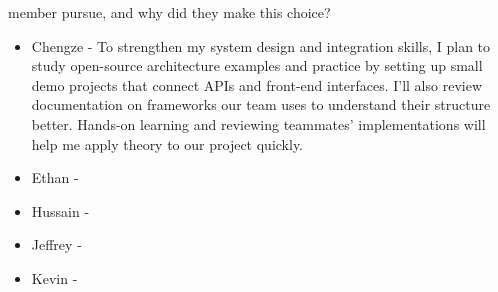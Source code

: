 \begin{enumerate}
  member pursue, and why did they make this choice?
  \begin{itemize}
        \item Chengze - To strengthen my system design and integration skills, 
        I plan to study open-source architecture examples and practice by setting 
        up small demo projects that connect APIs and front-end interfaces. I’ll also 
        review documentation on frameworks our team uses to understand their structure 
        better. Hands-on learning and reviewing teammates’ implementations will help 
        me apply theory to our project quickly.
        \item Ethan - 
        \item Hussain - 
        \item Jeffrey - 
        \item Kevin - 
  \end{itemize} 
\end{enumerate}
